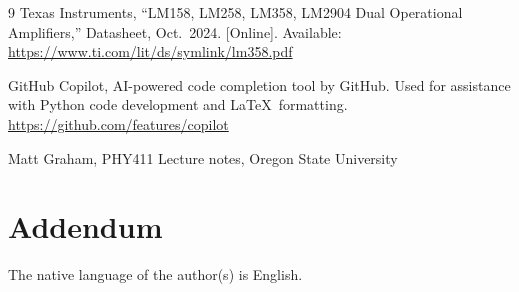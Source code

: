 \documentclass[11pt]{article}
\begin{document}
\begin{thebibliography}{9}
        \label{ref:lm358} Texas Instruments, ``LM158, LM258, LM358, LM2904 Dual Operational Amplifiers,'' Datasheet, Oct.\ 2024. [Online]. Available: \url{https://www.ti.com/lit/ds/symlink/lm358.pdf}

        GitHub Copilot, AI-powered code completion tool by GitHub. Used for assistance with Python code development and \LaTeX\ formatting. \url{https://github.com/features/copilot}

        Matt Graham, PHY411 Lecture notes, Oregon State University
\end{thebibliography}

\section*{Addendum}
The native language of the author(s) is English.
\end{document}

